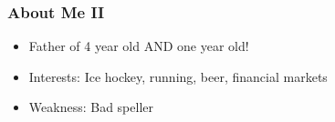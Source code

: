 \documentclass[10pt]{beamer}
\begin{document}


\begin{frame}[t]
\frametitle{About Me II}
\begin{itemize}
\item Father of 4 year old AND one year old! %
\medskip
\item Interests: Ice hockey, running, beer, financial markets
\medskip
\item Weakness: Bad speller
\end{itemize}
\bigskip
\end{frame}
\end{document}
